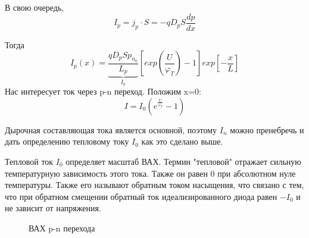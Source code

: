 В свою очередь, 
$$
I_p = j_p \cdot S = -qD_pS\frac{dp}{dx} 
$$

Тогда 
$$
I_p(x) = \underbrace{\frac{qD_pSp_{n_0}}{L_p}}_{I_0}\left[exp\left(\frac{U}{\varphi_T}\right) -1 \right] exp\left[-\frac{x}{L}\right]
$$
Нас интересует ток через p-n переход. Положим x=0:
\begin{equation}
I = I_0\left(e^{\frac{U}{\varphi_T}} -1 \right)
\end{equation}

Дырочная составляющая тока является основной, поэтому $I_n$ можно пренебречь и дать определению тепловому току $I_0$ как это сделано выше.

Тепловой ток $I_0$ определяет масштаб ВАХ. Термин "тепловой" отражает сильную температурную зависимость этого тока. Также он равен 0 при абсолютном нуле температуры. Также его называют обратным током насыщения, что связано с тем, что при обратном смещении обратный ток идеализированного диода равен $-I_0$ и не зависит от напряжения.

\begin{center}
	\begin{figure}[h!]
		\caption{ВАХ p-n перехода}
	\end{figure}
\end{center}
\pagebreak


